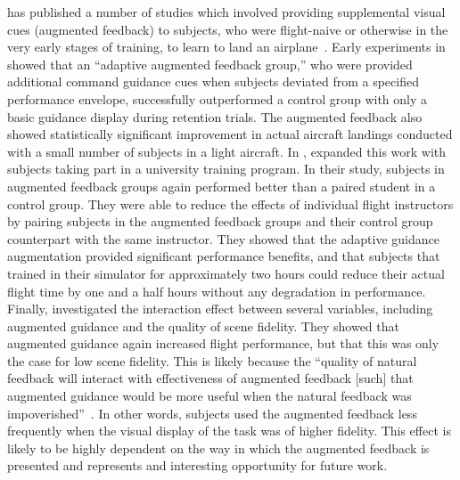 \citeauthor{doi:10.1177/001872088002200109} has published a number of studies which involved providing supplemental visual cues (augmented feedback) to subjects, who were flight-naive or otherwise in the very early stages of training, to learn to land an airplane~\citep{doi:10.1177/001872088002200109, doi:10.1177/001872089003200305, doi:10.1207/s15327108ijap0702_4}.
Early experiments in \citeyear{doi:10.1177/001872088002200109} showed that an ``adaptive augmented feedback group,'' who were provided additional command guidance cues when subjects deviated from a specified performance envelope, successfully outperformed a control group with only a basic guidance display during retention trials.
The augmented feedback also showed statistically significant improvement in actual aircraft landings conducted with a small number of subjects in a light aircraft.
In \citeyear{doi:10.1177/001872089003200305}, \citeauthor{doi:10.1177/001872089003200305} expanded this work with subjects taking part in a university training program.
In their study, subjects in augmented feedback groups again performed better than a paired student in a control group.
They were able to reduce the effects of individual flight instructors by pairing subjects in the augmented feedback groups and their control group counterpart with the same instructor.
They showed that the adaptive guidance augmentation provided significant performance benefits, and that subjects that trained in their simulator for approximately two hours could reduce their actual flight time by one and a half hours without any degradation in performance.
Finally, \citet{doi:10.1207/s15327108ijap0702_4} investigated the interaction effect between several variables, including augmented guidance and the quality of scene fidelity.
They showed that augmented guidance again increased flight performance, but that this was only the case for low scene fidelity.
This is likely because the ``quality of natural feedback will interact with effectiveness of augmented feedback [such] that augmented guidance would be more useful when the natural feedback was impoverished''~\citep{doi:10.1207/s15327108ijap0702_4}.
In other words, subjects used the augmented feedback less frequently when the visual display of the task was of higher fidelity.
This effect is likely to be highly dependent on the way in which the augmented feedback is presented and represents and interesting opportunity for future work.

